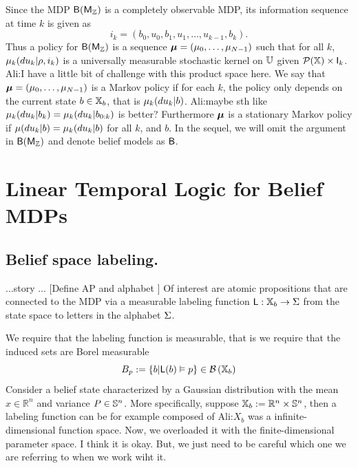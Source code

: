\documentclass{ifacconf}
\newcommand{\red}[1]{{\color{red} #1}}
\renewcommand{\axx}[1]{{\color{orange} Ali:#1}}
\newcommand{\new}[1]{{\color{blue}#1}}
\begin{document}
Since the MDP $\MB(\POMDP)$ is a completely observable MDP, its information sequence at time $k$ is given as  
\[i_k=(b_0, u_0, b_1, u_1, \ldots, u_{k-1},b_k).\]
Thus a policy for $\MB(\POMDP)$ %
 is a sequence $\polb=(\pol_0,\ldots,\pol_{N-1})$ such that  for all $k$, $\pol_k(du_k|\init, i_k)$ is a universally measurable stochastic kernel on $\A$  given $\mathcal{P}(\X)\times \I_k$. \axx{I have a little bit of challenge with this product space here.}
	We say that $\polb=(\pol_0,\ldots,\pol_{N-1})$ is a Markov policy if for each $k$, the policy only depends on the current state $b\in\Xb$, that is $\pol_k(du_k|b)$. \axx{maybe sth like $\pol_k(du_k|b_k)=\pol_k(du_k|b_{0:k})$ is better?}
	Furthermore 	 $\polb$ is a stationary Markov policy if $\pol(du_k|b)= \pol_k(du_k|b)$ for all $k$, and $b$.
\new{In the sequel, we will omit the argument in $\MB(\POMDP)$ and denote belief models as $\MB$. }
	


 \section{Linear Temporal Logic for Belief MDPs}
    
  

	\subsection{Belief space labeling.}\label{sec:DTL}  
\red{...story ...}
\red{[Define AP and alphabet ]}
Of interest are atomic propositions that are connected to the MDP via a measurable labeling function $\Lab:\Xb\rightarrow \alphabeth$ from the state space to letters in the alphabet $\alphabeth$.


We require that the labeling function is measurable, that is we require that the induced sets  are Borel measurable
\[B_p:=\{b|\Lab(b)\vDash p \}\in \borel{\Xb}\]      
Consider a belief state characterized by  a Gaussian distribution with the mean $\hat x\in \mathbb R^n $ and variance $P\in\S^n$. %
 More specifically, suppose  $\Xb:=\mathbb R^n\times \S^n$,  then a labeling function  can be for example composed of %
 \axx{$X_b$ was a infinite-dimensional function space. Now, we overloaded it with the finite-dimensional parameter space. I think it is okay. But, we just need to be careful which one we are referring to when we work wiht it.}
 
\end{document}
